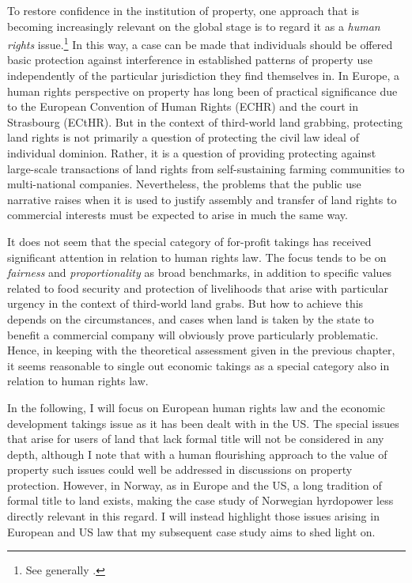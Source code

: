 To restore confidence in the institution of property, one approach that is becoming increasingly relevant on the global stage is to regard it as a {\it human rights} issue.\footnote{See generally \cite{schutter10,schutter11,kunnerman13}.} In this way, a case can be made that individuals should be offered basic protection against interference in established patterns of property use independently of the particular jurisdiction they find themselves in. In Europe, a human rights perspective on property has long been of practical significance due to the European Convention of Human Rights (ECHR) and the court in Strasbourg (ECtHR). But in the context of third-world land grabbing, protecting land rights is not primarily a question of protecting the civil law ideal of individual dominion. Rather, it is a question of providing protecting against large-scale transactions of land rights from self-sustaining farming communities to multi-national companies. Nevertheless, the problems that the public use narrative raises when it is used to justify assembly and transfer of land rights to commercial interests must be expected to arise in much the same way.

It does not seem that the special category of for-profit takings has received significant attention in relation to human rights law. The focus tends to be on {\it fairness} and {\it proportionality} as broad benchmarks, in addition to specific values related to food security and protection of livelihoods that arise with particular urgency in the context of third-world land grabs. But how to achieve this depends on the circumstances, and cases when land is taken by the state to benefit a commercial company will obviously prove particularly problematic. Hence, in keeping with the theoretical assessment given in the previous chapter, it seems reasonable to single out economic takings as a special category also in relation to human rights law. 

In the following, I will focus on European human rights law and the economic development takings issue as it has been dealt with in the US. The special issues that arise for users of land that lack formal title will not be considered in any depth, although I note that with a human flourishing approach to the value of property such issues could well be addressed in discussions on property protection. However, in Norway, as in Europe and the US, a long tradition of formal title to land exists, making the case study of Norwegian hyrdopower less directly relevant in this regard. I will instead highlight those issues arising in European and US law that my subsequent case study aims to shed light on.

